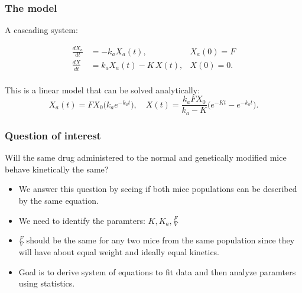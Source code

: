 \documentclass[t]{beamer}
\begin{document}
\begin{frame}
\frametitle{The model}
A cascading system:
\begin{center}
\end{center}

  \begin{align*}
    \frac{dX_a}{dt} &= -k_a X_a(t), &X_a(0) = F\\
    \frac{dX}{dt}   &= k_a X_a(t) - K\,X(t), &X(0) = 0.\\
  \end{align*}
\pause

This is a linear model that can be solved analytically:
$$
X_a(t) = FX_0 \big( k_ae^{-k_at} \big), \quad
X(t) = \frac{k_a F X_0}{k_a - K}\big( e^{-Kt} - e^{-k_a t}\big).
$$

\end{frame}
\begin{frame}
\frametitle{Question of interest}
\alert{Will the same drug administered to the normal and genetically modified mice behave kinetically the same? }
\begin{itemize}
\item We answer this question by seeing if both mice populations can be described by the same equation. 
\item We need to identify the paramters: $K, K_{a}, \frac{F}{V}$
\item $\frac{F}{V}$ should be the same for any two mice from the same population since they will have about equal weight and ideally equal kinetics. 
\item Goal is to derive system of equations to fit data and then analyze paramters using statistics.  
\end{itemize}
\end{frame}
\end{document}
